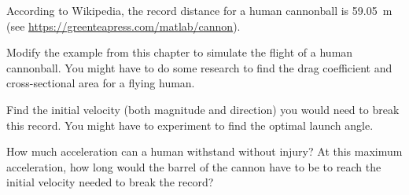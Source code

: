 \documentclass[../../book.tex]{subfiles}
\begin{document}
\begin{ex}
\label{cannon}


According to Wikipedia, the record distance for a human cannonball is \SI {59.05}{\meter} (see \url{https://greenteapress.com/matlab/cannon}).

Modify the example from this chapter to simulate the flight of a human cannonball.  You might have to do some research to find the drag coefficient and cross-sectional area for a flying human.

Find the initial velocity (both magnitude and direction) you would need to break this record.  You might have to experiment to find the optimal launch angle.

How much acceleration can a human withstand without injury?  At this maximum acceleration, how long would the barrel of the cannon have to be to reach the initial velocity needed to break the record?

\end{ex}
\end{document}
